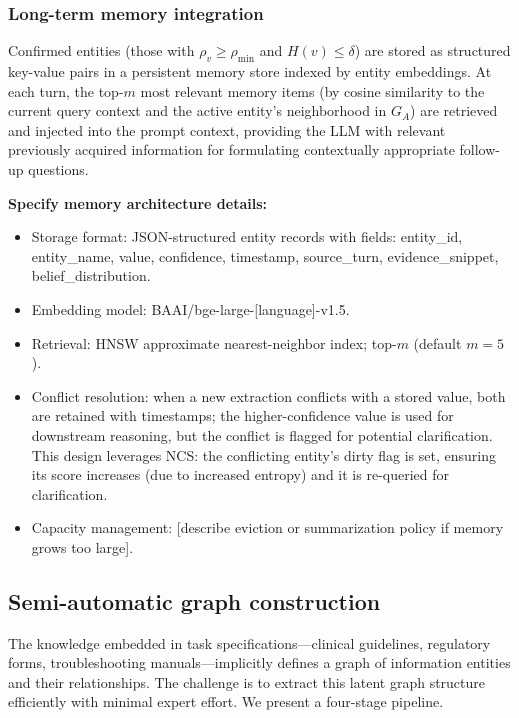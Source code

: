 \documentclass[11pt,a4paper]{article}
\newcommand{\placeholder}[1]{%
  \begin{tcolorbox}[colback=yellow!10,colframe=orange!60!black,
    fonttitle=\bfseries,title=Placeholder]
    #1
  \end{tcolorbox}%
}
\begin{document}
\subsubsection{Long-term memory integration}

Confirmed entities (those with $\rho_v \geq \rho_{\min}$ and
$H(v) \leq \delta$) are stored as structured key-value pairs in a persistent
memory store indexed by entity embeddings. At each turn, the top-$m$ most
relevant memory items (by cosine similarity to the current query context and
the active entity's neighborhood in $G_A$) are retrieved and injected into
the prompt context, providing the LLM with relevant previously acquired
information for formulating contextually appropriate follow-up questions.

\placeholder{%
  \textbf{Specify memory architecture details:}
  \begin{itemize}[noitemsep]
    \item Storage format: JSON-structured entity records with fields:
          entity\_id, entity\_name, value, confidence, timestamp, source\_turn,
          evidence\_snippet, belief\_distribution.
    \item Embedding model: BAAI/bge-large-[language]-v1.5.
    \item Retrieval: HNSW approximate nearest-neighbor index; top-$m$
          (default $m = 5$).
    \item Conflict resolution: when a new extraction conflicts with a stored
          value, both are retained with timestamps; the higher-confidence
          value is used for downstream reasoning, but the conflict is flagged
          for potential clarification. This design leverages NCS: the
          conflicting entity's dirty flag is set, ensuring its score
          increases (due to increased entropy) and it is re-queried for
          clarification.
    \item Capacity management: [describe eviction or summarization policy if
          memory grows too large].
  \end{itemize}
}

\subsection{Semi-automatic graph construction}
\label{sec:graph_construction}

The knowledge embedded in task specifications—clinical guidelines,
regulatory forms, troubleshooting manuals—implicitly defines a graph of
information entities and their relationships. The challenge is to extract
this latent graph structure efficiently with minimal expert effort. We
present a four-stage pipeline.
\end{document}
